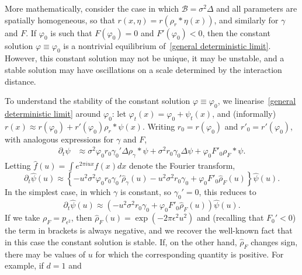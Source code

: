 \documentclass[12pt]{article}
\def \hat{\widehat}
\newcommand{\DG}{\mathcal{B}}  %
\newcommand{\kernel}{\rho}  %
\newcommand{\smooth}[1]{\kernel_{#1} \! * \!}  %
\numberwithin{equation}{section}
\begin{document}
More mathematically, consider the case in which
$\DG = \sigma^2 \Delta$ and all 
parameters are spatially homogeneous,
so that $r(x, \eta) = r(\smooth{r}\eta(x))$, and similarly for $\gamma$ and $F$.
If $\varphi_0$ is such that $F(\varphi_0)=0$ and $F'(\varphi_0)<0$, then the
constant solution $\varphi\equiv\varphi_0$ is a nontrivial equilibrium
of~\eqref{general deterministic limit}.
However, this constant solution may not be unique, it may be unstable,
and a stable solution may have oscillations on a scale determined by the interaction distance.

To understand the stability of the constant solution $\varphi\equiv\varphi_0$, 
we
linearise~\eqref{general deterministic limit} around $\varphi_0$:
let $\varphi_t(x) = \varphi_0 + \psi_t(x)$,
and (informally) $r(x) \approx r(\varphi_0) + r'(\varphi_0) \smooth{r} \psi(x)$.
Writing $r_0 = r(\varphi_0)$ and $r'_0 = r'(\varphi_0)$,
with analogous expressions for $\gamma$ and $F$,
\begin{align*}
    \partial_t \psi
    &\approx
    \sigma^2 \varphi_0 r_0 \gamma_0' \Delta \smooth{\gamma} \psi
    + \sigma^2 r_0 \gamma_0 \Delta \psi
    + \varphi_0 F'_0 \smooth{F} \psi .
\end{align*}
Letting $\hat f(u) = \int e^{2\pi i u x} f(x) dx$ denote the Fourier transform,
\begin{equation}
	\label{fourier transform psi}
    \partial_t \hat \psi(u)
    \approx
	\left\{
	- u^2\sigma^2 \varphi_0 r_0 \gamma_0' \hat{\rho}_\gamma(u) 
        - u^2 \sigma^2 r_0 \gamma_0
	+ \varphi_0 F'_0 \hat{\rho}_F(u) 
	\right\} \hat \psi(u) .
\end{equation}
In the simplest case, in which $\gamma$ is constant, so $\gamma_0'=0$,
this reduces to
\begin{equation} %
	\label{simplest FT}
	\partial_t \hat \psi(u)
    \approx
    \left(
        - u^2 \sigma^2 r_0 \gamma_0
	+ \varphi_0 F'_0 \hat{\rho}_F(u) 
    \right) \hat \psi(u) .
\end{equation} %
If we take $\rho_F=p_{\epsilon^2}$, then 
$\hat{\rho}_F(u)=\exp(-2\pi\epsilon^2 u^2)$ and (recalling 
that $F_0'<0$) the term in brackets is always negative, and we recover
the well-known fact that in this case the constant solution is stable.
If, on the other hand, $\hat{\rho}_F$ changes sign, there may be values of $u$ for which the corresponding quantity is positive. For example, if $d=1$ and
\end{document}
